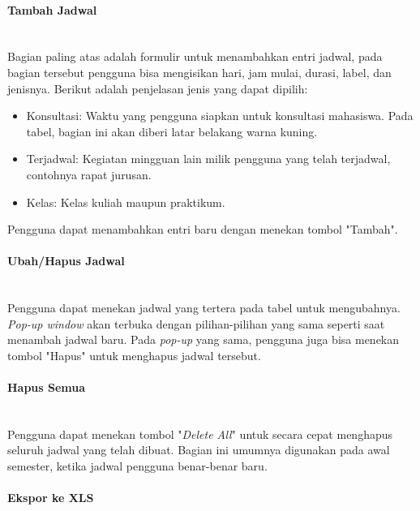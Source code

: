 \paragraph{Tambah Jadwal}
\label{sec:bluetape_tambah_jadwal}
\phantom{blank}\\

Bagian paling atas adalah formulir untuk menambahkan entri jadwal, pada bagian tersebut pengguna bisa mengisikan hari, jam mulai, durasi, label, dan jenisnya. Berikut adalah penjelasan jenis yang dapat dipilih:
\begin{itemize}
	\item Konsultasi: Waktu yang pengguna siapkan untuk konsultasi mahasiswa. Pada tabel, bagian ini akan diberi latar belakang warna kuning.
	\item Terjadwal: Kegiatan mingguan lain milik pengguna yang telah terjadwal, contohnya rapat jurusan.
	\item Kelas: Kelas kuliah maupun praktikum.
\end{itemize}

Pengguna dapat menambahkan entri baru dengan menekan tombol "Tambah".

\paragraph{Ubah/Hapus Jadwal}
\label{sec:bluetape_ubah_hapus_jadwal}
\phantom{blank}\\

Pengguna dapat menekan jadwal yang tertera pada tabel untuk mengubahnya. \textit{Pop-up window} akan terbuka dengan pilihan-pilihan yang sama seperti saat menambah jadwal baru. Pada \textit{pop-up} yang sama, pengguna juga bisa menekan tombol "Hapus" untuk menghapus jadwal tersebut.

\paragraph{Hapus Semua}
\label{sec:bluetape_hapus_semua}
\phantom{blank}\\

Pengguna dapat menekan tombol "\textit{Delete All}" untuk secara cepat menghapus seluruh jadwal yang telah dibuat. Bagian ini umumnya digunakan pada awal semester, ketika jadwal pengguna benar-benar baru.

\paragraph{Ekspor ke XLS}
\label{sec:bluetape_ekspor_ke_xls}
\phantom{blank}\\

